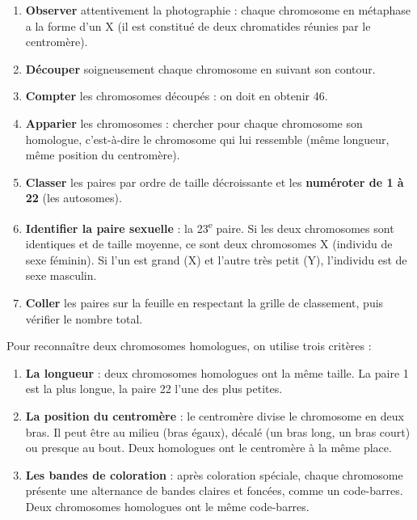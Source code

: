 \documentclass[11pt]{article}
\newcommand{\cle}[1]{{\popxbold\color{popdark}#1}}
\begin{document}
\begin{methode}
\begin{enumerate}
\item \textbf{Observer} attentivement la photographie : chaque chromosome en métaphase a la forme d'un X (il est constitué de deux \cle{chromatides} réunies par le \cle{centromère}).
\item \textbf{Découper} soigneusement chaque chromosome en suivant son contour.
\item \textbf{Compter} les chromosomes découpés : on doit en obtenir 46.
\item \textbf{Apparier} les chromosomes : chercher pour chaque chromosome son \cle{homologue}, c'est-à-dire le chromosome qui lui ressemble (même longueur, même position du centromère).
\item \textbf{Classer} les paires par ordre de taille décroissante et les \textbf{numéroter de 1 à 22} (les autosomes).
\item \textbf{Identifier la paire sexuelle} : la 23\textsuperscript{e} paire. Si les deux chromosomes sont identiques et de taille moyenne, ce sont deux chromosomes X (individu de sexe féminin). Si l'un est grand (X) et l'autre très petit (Y), l'individu est de sexe masculin.
\item \textbf{Coller} les paires sur la feuille en respectant la grille de classement, puis vérifier le nombre total.
\end{enumerate}
\end{methode}

\begin{methode}
Pour reconnaître deux chromosomes homologues, on utilise trois critères :
\begin{enumerate}
\item \textbf{La longueur} : deux chromosomes homologues ont la même taille. La paire 1 est la plus longue, la paire 22 l'une des plus petites.
\item \textbf{La position du centromère} : le centromère divise le chromosome en deux bras. Il peut être au milieu (bras égaux), décalé (un bras long, un bras court) ou presque au bout. Deux homologues ont le centromère à la même place.
\item \textbf{Les bandes de coloration} : après coloration spéciale, chaque chromosome présente une alternance de bandes claires et foncées, comme un code-barres. Deux chromosomes homologues ont le même code-barres.
\end{enumerate}
\end{methode}
\end{document}
